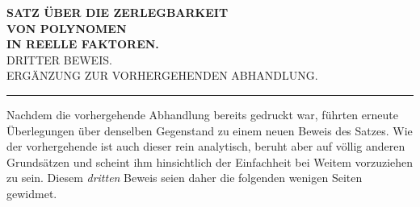 \begin{center}
\textbf{SATZ ÜBER DIE ZERLEGBARKEIT}\\[8pt]
\textbf{VON POLYNOMEN}\\[8pt]
\textbf{IN REELLE FAKTOREN.}\\[8pt]
DRITTER BEWEIS.\\[8pt]
ERGÄNZUNG ZUR VORHERGEHENDEN ABHANDLUNG.\\[12pt]
\rule{3cm}{0.3pt}
\end{center}
Nachdem die vorhergehende Abhandlung bereits gedruckt war, führten erneute Überlegungen über denselben Gegenstand zu einem neuen Beweis des Satzes. Wie der vorhergehende ist auch dieser rein analytisch, beruht aber auf völlig anderen Grundsätzen und scheint ihm hinsichtlich der Einfachheit bei Weitem vorzuziehen zu sein. Diesem \textit{dritten} Beweis seien daher die folgenden wenigen Seiten gewidmet.

